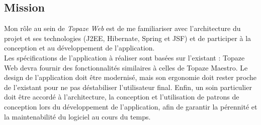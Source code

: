 \subsection{Mission}
Mon rôle au sein de \textit{Topaze Web} est de me familiariser avec l'architecture du projet et ses technologies (J2EE, Hibernate, Spring et JSF) et de participer à la conception et au développement de l'application.\\

Les spécifications de l’application à réaliser sont basées sur l'existant : Topaze Web devra fournir des fonctionnalités similaires à celles de Topaze Maestro. Le design de l'application doit être modernisé, mais son ergonomie doit rester proche de l'existant pour ne pas déstabiliser l'utilisateur final. Enfin, un soin particulier doit être accordé à l'architecture, la conception et l'utilisation de patrons de conception lors du développement de l'application, afin de garantir la pérennité et la maintenabilité du logiciel au cours du temps. 




